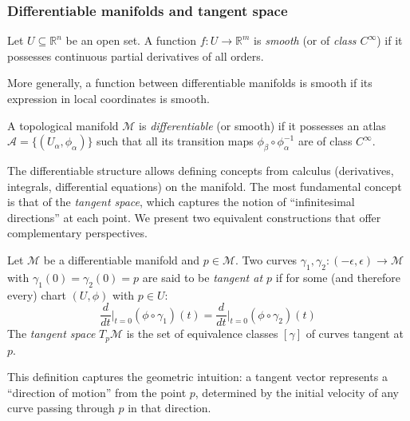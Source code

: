 \subsubsection{Differentiable manifolds and tangent space}\label{subsubsec:variedades_diferenciables}

\begin{definition}\label{def:funcion_suave}
Let $U \subseteq \mathbb{R}^n$ be an open set. A function $f: U \rightarrow \mathbb{R}^m$ is \textit{smooth} (or of \textit{class $C^\infty$}) if it possesses continuous partial derivatives of all orders.
\end{definition}

More generally, a function between differentiable manifolds is smooth if its expression in local coordinates is smooth.

\begin{definition}\label{def:variedad_diferenciable}
A topological manifold $\mathcal{M}$ is \textit{differentiable} (or smooth) if it possesses an atlas $\mathcal{A} = \{(U_\alpha, \phi_\alpha)\}$ such that all its transition maps $\phi_\beta \circ \phi_\alpha^{-1}$ are of class $C^\infty$.
\end{definition}

The differentiable structure allows defining concepts from calculus (derivatives, integrals, differential equations) on the manifold. The most fundamental concept is that of the \textit{tangent space}, which captures the notion of ``infinitesimal directions'' at each point. We present two equivalent constructions that offer complementary perspectives.

\begin{definition}\label{def:espacio_tangente_curvas}
Let $\mathcal{M}$ be a differentiable manifold and $p \in \mathcal{M}$. Two curves $\gamma_1, \gamma_2: (-\epsilon, \epsilon) \to \mathcal{M}$ with $\gamma_1(0) = \gamma_2(0) = p$ are said to be \textit{tangent at $p$} if for some (and therefore every) chart $(U, \phi)$ with $p \in U$:
\[
\frac{d}{dt}\bigg|_{t=0} (\phi \circ \gamma_1)(t) = \frac{d}{dt}\bigg|_{t=0} (\phi \circ \gamma_2)(t)
\]
The \textit{tangent space} $T_p\mathcal{M}$ is the set of equivalence classes $[\gamma]$ of curves tangent at $p$.
\end{definition}

This definition captures the geometric intuition: a tangent vector represents a ``direction of motion'' from the point $p$, determined by the initial velocity of any curve passing through $p$ in that direction.

